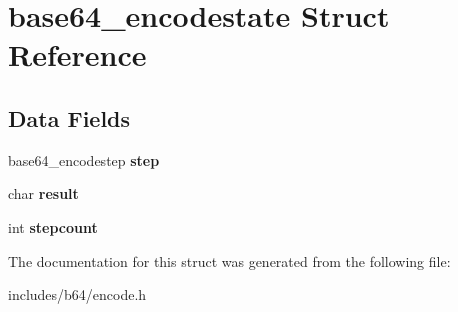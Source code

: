 \hypertarget{structbase64_1_1base64__encodestate}{\section{base64\-\_\-encodestate Struct Reference}
\label{structbase64_1_1base64__encodestate}
}
\subsection*{Data Fields}
\begin{DoxyCompactItemize}
\item 
\hypertarget{structbase64_1_1base64__encodestate_a03379869bcae52baa816bfb820a526d2}{base64\-\_\-encodestep {\bfseries step}}\label{structbase64_1_1base64__encodestate_a03379869bcae52baa816bfb820a526d2}

\item 
\hypertarget{structbase64_1_1base64__encodestate_a53ba5e5a2744d7ec9192157fc755a94d}{char {\bfseries result}}\label{structbase64_1_1base64__encodestate_a53ba5e5a2744d7ec9192157fc755a94d}

\item 
\hypertarget{structbase64_1_1base64__encodestate_abaa3aa9865cb2e6be3da3d466554c0b5}{int {\bfseries stepcount}}\label{structbase64_1_1base64__encodestate_abaa3aa9865cb2e6be3da3d466554c0b5}

\end{DoxyCompactItemize}


The documentation for this struct was generated from the following file\-:\begin{DoxyCompactItemize}
\item 
includes/b64/encode.\-h\end{DoxyCompactItemize}

